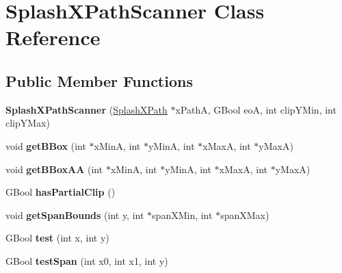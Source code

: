 \hypertarget{class_splash_x_path_scanner}{}\section{Splash\+X\+Path\+Scanner Class Reference}
\label{class_splash_x_path_scanner}
\subsection*{Public Member Functions}
\begin{DoxyCompactItemize}
\item 
\mbox{\label{class_splash_x_path_scanner_a111620dda9aa170b87f32c158490d262}} 
{\bfseries Splash\+X\+Path\+Scanner} (\hyperlink{class_splash_x_path}{Splash\+X\+Path} $\ast$x\+PathA, G\+Bool eoA, int clip\+Y\+Min, int clip\+Y\+Max)
\item 
\mbox{\label{class_splash_x_path_scanner_adce6b85970c8c2dfb6d765b3343eedd3}} 
void {\bfseries get\+B\+Box} (int $\ast$x\+MinA, int $\ast$y\+MinA, int $\ast$x\+MaxA, int $\ast$y\+MaxA)
\item 
\mbox{\label{class_splash_x_path_scanner_aa4012eef3821b4a0939b31e7c3f5ab7b}} 
void {\bfseries get\+B\+Box\+AA} (int $\ast$x\+MinA, int $\ast$y\+MinA, int $\ast$x\+MaxA, int $\ast$y\+MaxA)
\item 
\mbox{\label{class_splash_x_path_scanner_a9aaa26cdd35db274aca7d1973d512433}} 
G\+Bool {\bfseries has\+Partial\+Clip} ()
\item 
\mbox{\label{class_splash_x_path_scanner_a86a65b54af9ed84e06e3a4d0e9df2e5c}} 
void {\bfseries get\+Span\+Bounds} (int y, int $\ast$span\+X\+Min, int $\ast$span\+X\+Max)
\item 
\mbox{\label{class_splash_x_path_scanner_a9cad84d0cc60ae921febaef12c38a970}} 
G\+Bool {\bfseries test} (int x, int y)
\item 
\mbox{\label{class_splash_x_path_scanner_a5bd6a1d793511ad7b9d77db5ea5bafb6}} 
G\+Bool {\bfseries test\+Span} (int x0, int x1, int y)

\end{DoxyCompactItemize}
